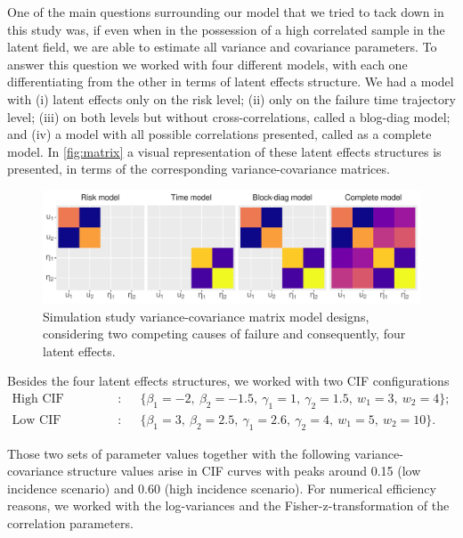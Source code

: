 \documentclass[a4paper,12pt]{article}
\begin{document}
One of the main questions surrounding our model that we tried to tack
down in this study was, if even when in the possession of a high
correlated sample in the latent field, we are able to estimate all
variance and covariance parameters. To answer this question we worked
with four different models, with each one differentiating from the other
in terms of latent effects structure. We had a model with (i) latent
effects only on the risk level; (ii) only on the failure time trajectory
level; (iii) on both levels but without cross-correlations, called a
blog-diag model; and (iv) a model with all possible correlations
presented, called as a complete model. In \autoref{fig:matrix} a visual
representation of these latent effects structures is presented, in terms
of the corresponding variance-covariance matrices.

\begin{figure}[H]
 \centering \includegraphics[width=\linewidth]{pics/matrix-1.png}
 \vspace{-0.75cm}
 \caption{Simulation study variance-covariance matrix model designs,
   considering two competing causes of failure and consequently, four
   latent effects.}
 \label{fig:matrix}
\end{figure}

Besides the four latent effects structures, we worked with two CIF
configurations
\begin{align*}
 \text{High CIF configuration}:~&\quad
 \{\beta_{1} = -2,~\beta_{2} = -1.5,~\gamma_{1} = 1,~\gamma_{2} = 1.5,~
   w_{1} = 3,~w_{2} = 4
 \};\\
 \text{Low CIF configuration}:~&\quad
 \{\beta_{1} = 3,~\beta_{2} = 2.5,~\gamma_{1} = 2.6,~\gamma_{2} = 4,~
   w_{1} = 5,~w_{2} = 10
 \}.
\end{align*}

Those two sets of parameter values together with the following
variance-covariance structure values arise in CIF curves with peaks
around 0.15 (low incidence scenario) and 0.60 (high incidence scenario).
For numerical efficiency reasons, we worked with the log-variances and
the Fisher-z-transformation of the correlation parameters.
\end{document}
